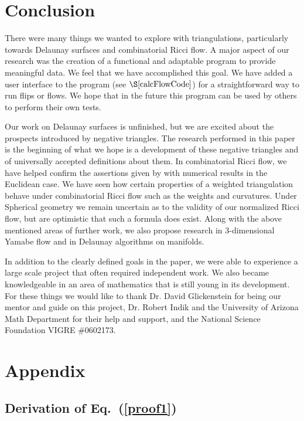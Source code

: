 \documentclass[12pt]{article}
\begin{document}
\section{Conclusion}

There were many things we wanted to explore with triangulations, particularly towards Delaunay surfaces and combinatorial Ricci flow. A major aspect of our research was the creation of a functional and adaptable program to provide meaningful data. We feel that we have accomplished this goal. We have added a user interface to the program (see $\S\ref{calcFlowCode}$) for a straightforward way to run flips or flows. We hope that in the future this program can be used by others to perform their own tests.

 Our work on Delaunay surfaces is unfinished, but we are excited about the prospects introduced by negative triangles. The research performed in this paper is the beginning of what we hope is a development of these negative triangles and of universally accepted definitions about them. In combinatorial Ricci flow, we have helped confirm the assertions given by \cite{chowluo} with numerical results in the Euclidean case. We have seen how certain properties of a weighted triangulation behave under combinatorial Ricci flow such as the weights and curvatures. Under Spherical geometry we remain uncertain as to the validity of our normalized Ricci flow, but are optimistic that such a formula does exist. Along with the above mentioned areas of further work, we also propose research in 3-dimensional Yamabe flow and in Delaunay algorithms on manifolds.

 In addition to the clearly defined goals in the paper, we were able to experience a large scale project that often required independent work. We also became knowledgeable in an area of mathematics that is still young in its development. For these things we would like to thank Dr. David Glickenstein for being our mentor and guide on this project, Dr. Robert Indik and the University of Arizona Math Department for their help and support, and the National Science Foundation VIGRE $\#$0602173.

\newpage
  


\newpage
\appendix
\section{Appendix}

\subsection{Derivation of Eq.~(\ref{proof1})}
\maketitle
	
\end{document}
